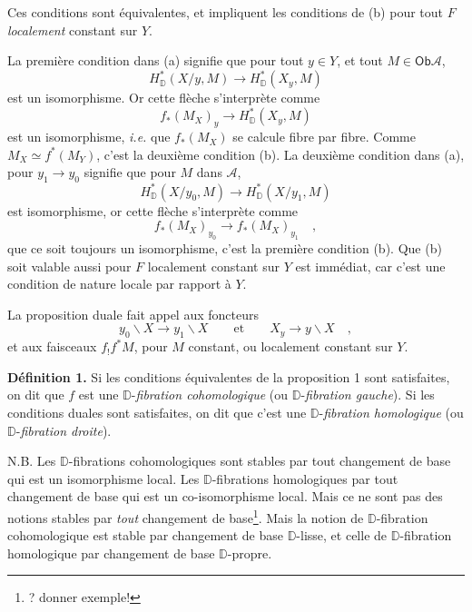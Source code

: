 \documentclass[11pt,leqno]{article}
\newcommand{\printedpage}[1]{\marginpar{\footnotesize p.~#1}}
\newcommand{\msp}[1]{\marginpar{\footnotesize [#1]}}
\newcommand{\Ob}{\mathsf{Ob}}
\newcommand{\D}{\mathbb{D}}
\newcommand{\bs}{\backslash}
\begin{document}
Ces conditions sont équivalentes, et impliquent les conditions de (b) pour tout $F$ \textit{localement} constant sur $Y$.

La première condition dans (a) signifie que pour tout $y \in Y$, et tout $M \in \Ob \mathcal{A}$,
\[
H^*_{\D}(X/y, M) \longrightarrow H^*_{\D}(X_y, M)
\]
est un isomorphisme. Or cette flèche s'interprète comme
\[
f_*(M_X)_y \longrightarrow H^*_{\D}(X_y, M)
\]
est un isomorphisme, \textit{i.e.} que $f_*(M_X)$ se calcule fibre par fibre. Comme $M_X \simeq f^*(M_Y)$, c'est la deuxième condition (b). La deuxième condition dans (a), pour $y_1 \to y_0$ signifie que pour $M$ dans $\mathcal{A}$,
\[
H^*_{\D}(X/y_0, M) \longrightarrow H^*_{\D}(X/y_1, M)
\]
est isomorphisme, or cette flèche s'interprète comme
\[
f_*(M_X)_{y_0} \longrightarrow f_*(M_X)_{y_1} \quad ,
\]
que ce soit toujours un isomorphisme, c'est la première condition (b). Que (b) soit valable aussi pour $F$ localement constant sur $Y$ est immédiat, car c'est une condition de nature locale par rapport à $Y$.

\msp{page 77}

La proposition duale fait appel aux foncteurs
\[
y_0\bs X \longrightarrow y_1\bs X \qquad \text{et} \qquad X_y \longrightarrow y\bs X \quad ,
\]
et aux faisceaux $f_!f^*M$, pour $M$ constant, ou localement constant sur $Y$.

\printedpage{47}
\textbf{Définition 1.} Si les conditions équivalentes de la proposition 1 sont satisfaites, on dit que $f$ est une $\D$-\textit{fibration cohomologique} (ou $\D$-\textit{fibration gauche}). Si les conditions duales sont satisfaites, on dit que c'est une $\D$-\textit{fibration homologique} (ou $\D$-\textit{fibration droite}).

N.B. Les $\D$-fibrations cohomologiques sont stables par tout changement de base qui est un isomorphisme local. Les $\D$-fibrations homologiques par tout changement de base qui est un co-isomorphisme local. Mais ce ne sont pas des notions stables par \textit{tout} changement de base\footnote[34]{? donner exemple!}. Mais la notion de $\D$-fibration cohomologique est stable par changement de base $\D$-lisse, et celle de $\D$-fibration homologique par changement de base $\D$-propre.
\end{document}
